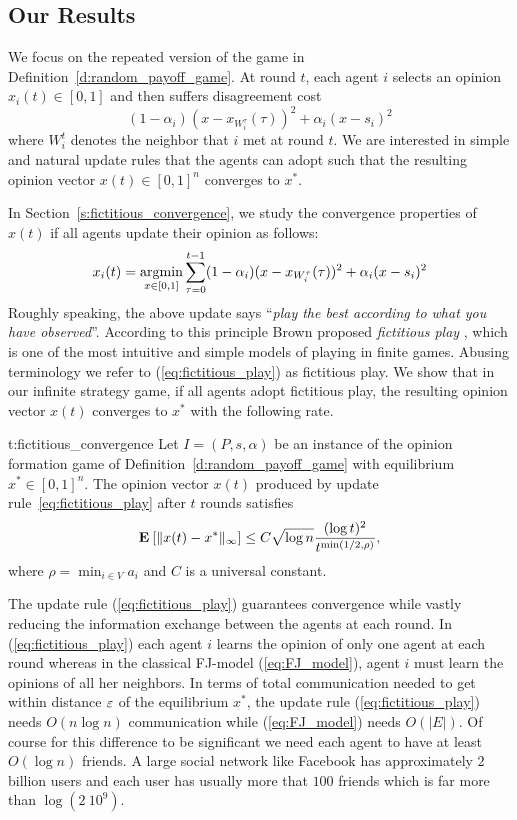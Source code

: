 \subsection{Our Results}

We focus on the repeated version of the game in Definition~\ref{d:random_payoff_game}.
At round $t$, each agent $i$ selects an opinion $x_i(t) \in [0,1]$ and then suffers
disagreement cost \[(1-\alpha_i)(x-x_{W_i^\tau}(\tau))^2+\alpha_i(x-s_i)^2 \]
where $W_i^t$ denotes the neighbor that $i$ met at round $t$.
We are interested in simple and natural update rules
that the agents can adopt such that the resulting opinion
vector $x(t) \in [0,1]^n$ converges to $x^*$.

In Section~\ref{s:fictitious_convergence},
we study the convergence properties of $x(t)$ if all agents
update their opinion as follows:
\begin{equation}\label{eq:fictitious_play}
  x_i(t) =
  \operatorname*{argmin}_{x \in [0,1]}
  \sum_{\tau=0}^{t-1}(1-\alpha_i)(x-x_{W_i^\tau}(\tau))^2+\alpha_i(x-s_i)^2
\end{equation}
%
Roughly speaking, the above update says
\enquote{\emph{play the best according to what you have observed}}.
According to this principle Brown proposed \emph{fictitious play} \cite{Bro51},
which is one of the most intuitive and simple models of playing in finite games.
Abusing terminology we refer to (\ref{eq:fictitious_play})
as fictitious play. We show that in our infinite strategy game, if all agents
adopt fictitious play, the resulting opinion vector $x(t)$ converges to
$x^*$ with the following rate.
%
\begin{reptheorem}{t:fictitious_convergence}
  Let $I = (P,s, \alpha)$ be an instance of the opinion formation
  game of Definition~\ref{d:random_payoff_game} with equilibrium
  $x^* \in [0,1]^n$.  The opinion vector $x(t)$ produced by
  update rule~\ref{eq:fictitious_play} after $t$ rounds satisfies
  \[
    \bm{\mathrm{E}}_{} \left[ \| x(t) - x^* \|_{\infty} \right] \leq
    C \sqrt{\log n}\frac{(\log t)^{2}}{t^{\min(1/2,\rho)}},
  \]
  where $\rho = \min_{i \in V} a_i$ and $C$ is a universal constant.
\end{reptheorem}

The update rule (\ref{eq:fictitious_play}) guarantees convergence
while vastly reducing the information exchange between the agents
at each round. In (\ref{eq:fictitious_play}) each agent $i$ learns the opinion of only one agent
at each round whereas in the classical FJ-model (\ref{eq:FJ_model}), agent $i$ must
learn the opinions of all her neighbors. In terms of
total communication needed to get within distance $\varepsilon$ of the
equilibrium $x^*$, the update rule (\ref{eq:fictitious_play}) needs
$O(n \log n)$ communication while (\ref{eq:FJ_model}) needs
$O(|E|)$. Of course for this difference to be significant we need
each agent to have at least $O(\log n)$ friends. A large social
network like Facebook has approximately $2$ billion users and each user
has usually more that $100$ friends which is far more than $\log(2\ 10^9)$.

